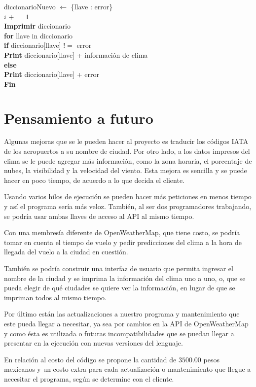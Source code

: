 \documentclass[]{article}
\begin{document}
\indent\indent\indent\indent diccionarioNuevo $ \leftarrow $ \{llave : error\}\\
\indent\indent\indent\indent $ i $ $ += $ $ 1 $\\
\indent\textbf{Imprimir} diccionario\\
\indent\indent \textbf{for} llave in diccionario\\
\indent\indent\indent \textbf{if} diccionario[llave] $ != $ error\\
\indent\indent\indent\indent \textbf{Print} diccionario[llave] + información de clima\\
\indent\indent\indent \textbf{else}\\
\indent\indent\indent\indent \textbf{Print} diccionario[llave] + error\\
\textbf{Fin}

\section{Pensamiento a futuro}
Algunas mejoras que se le pueden hacer al proyecto es traducir los códigos 
IATA de los aeropuertos a su nombre de ciudad. Por otro lado, a los datos 
impresos del clima se le puede agregar más información, como la zona 
horaria, el porcentaje de nubes, la visibilidad y la velocidad del viento. Esta 
mejora es sencilla y se puede hacer en poco tiempo, de acuerdo a lo que 
decida el cliente.

Usando varios hilos de ejecución se pueden hacer más peticiones en menos 
tiempo y así el programa sería más veloz. También, al ser dos 
programadores trabajando, se podría usar ambas llaves de acceso al API al 
mismo tiempo.

Con una membresía diferente de OpenWeatherMap, que tiene costo, se 
podría tomar en cuenta el tiempo de vuelo y pedir predicciones del clima a la 
hora de llegada del vuelo a la ciudad en cuestión.

También se podría construir una interfaz de usuario que permita ingresar 
el nombre de la ciudad y se imprima la información del clima uno a uno, o, 
que se pueda elegir de qué ciudades se quiere ver la información, en lugar de 
que se impriman todos al mismo tiempo.

Por último están las actualizaciones a nuestro programa y mantenimiento que este pueda llegar a necesitar, ya sea por cambios en la API de OpenWeatherMap y como ésta es utilizada o futuras incompatibilidades que se puedan llegar a presentar en la ejecución con nuevas versiones del lenguaje.

En relación al costo del código se propone la cantidad de $ 3500.00 $ pesos mexicanos y un costo extra para cada actualización o mantenimiento que llegue a necesitar el programa, según se determine con el cliente.
\end{document}
